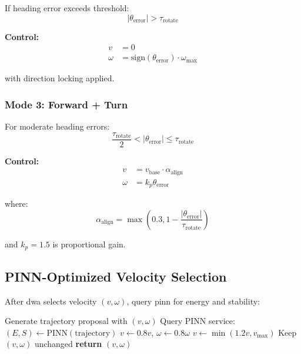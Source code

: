 If heading error exceeds threshold:
\begin{equation}
|\theta_{\text{error}}| > \tau_{\text{rotate}}
\label{eq:rotate_condition}
\end{equation}

\textbf{Control:}
\begin{equation}
\begin{aligned}
v &= 0 \\
\omega &= \text{sign}(\theta_{\text{error}}) \cdot \omega_{\max}
\end{aligned}
\label{eq:rotate_control}
\end{equation}

with direction locking applied.

\subsubsection{Mode 3: Forward + Turn}

For moderate heading errors:
\begin{equation}
\frac{\tau_{\text{rotate}}}{2} < |\theta_{\text{error}}| \leq \tau_{\text{rotate}}
\label{eq:forward_turn_condition}
\end{equation}

\textbf{Control:}
\begin{equation}
\begin{aligned}
v &= v_{\text{base}} \cdot \alpha_{\text{align}} \\
\omega &= k_p \theta_{\text{error}}
\end{aligned}
\label{eq:forward_turn_control}
\end{equation}

where:
\begin{equation}
\alpha_{\text{align}} = \max\left(0.3, 1 - \frac{|\theta_{\text{error}}|}{\tau_{\text{rotate}}}\right)
\label{eq:alignment_factor}
\end{equation}

and $k_p = 1.5$ is proportional gain.

\subsection{PINN-Optimized Velocity Selection}

After \acrshort{dwa} selects velocity $(v, \omega)$, query \acrshort{pinn} for energy and stability:

\begin{algorithm}[h]
\caption{PINN Velocity Optimization}
\label{alg:pinn_velocity}
\begin{algorithmic}[1]
\State Generate trajectory proposal with $(v, \omega)$
\State Query PINN service: $(E, S) \leftarrow \text{PINN}(\text{trajectory})$
    \State $v \leftarrow 0.8v$, $\omega \leftarrow 0.8\omega$ 
    \State $v \leftarrow \min(1.2v, v_{\max})$ 
\Else
    \State Keep $(v, \omega)$ unchanged
\EndIf
\State \textbf{return} $(v, \omega)$
\end{algorithmic}
\end{algorithm}

